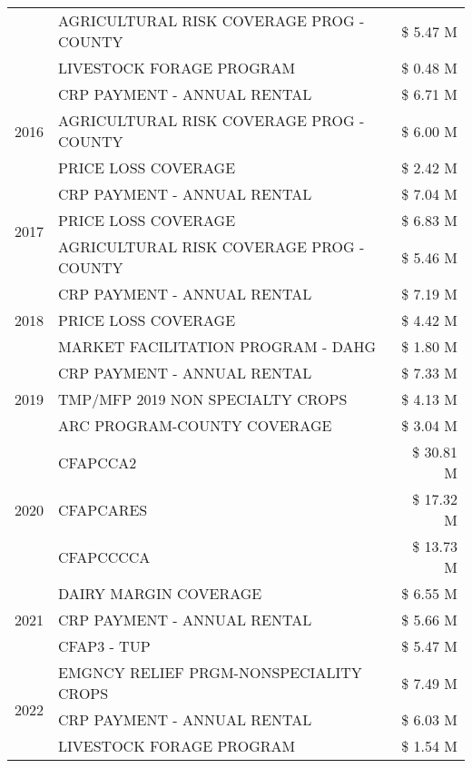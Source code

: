 \begin{tabular}{llr}
 & AGRICULTURAL RISK COVERAGE PROG - COUNTY & \$ 5.47 M \\
 & LIVESTOCK FORAGE PROGRAM & \$ 0.48 M \\
\cline{1-3}
\multirow[t]{3}{*}{2016} & CRP PAYMENT - ANNUAL RENTAL & \$ 6.71 M \\
 & AGRICULTURAL RISK COVERAGE PROG - COUNTY & \$ 6.00 M \\
 & PRICE LOSS COVERAGE & \$ 2.42 M \\
\cline{1-3}
\multirow[t]{3}{*}{2017} & CRP PAYMENT - ANNUAL RENTAL & \$ 7.04 M \\
 & PRICE LOSS COVERAGE & \$ 6.83 M \\
 & AGRICULTURAL RISK COVERAGE PROG - COUNTY & \$ 5.46 M \\
\cline{1-3}
\multirow[t]{3}{*}{2018} & CRP PAYMENT - ANNUAL RENTAL & \$ 7.19 M \\
 & PRICE LOSS COVERAGE & \$ 4.42 M \\
 & MARKET FACILITATION PROGRAM - DAHG & \$ 1.80 M \\
\cline{1-3}
\multirow[t]{3}{*}{2019} & CRP PAYMENT - ANNUAL RENTAL & \$ 7.33 M \\
 & TMP/MFP 2019 NON SPECIALTY CROPS & \$ 4.13 M \\
 & ARC PROGRAM-COUNTY COVERAGE & \$ 3.04 M \\
\cline{1-3}
\multirow[t]{3}{*}{2020} & CFAPCCA2 & \$ 30.81 M \\
 & CFAPCARES & \$ 17.32 M \\
 & CFAPCCCCA & \$ 13.73 M \\
\cline{1-3}
\multirow[t]{3}{*}{2021} & DAIRY MARGIN COVERAGE & \$ 6.55 M \\
 & CRP PAYMENT - ANNUAL RENTAL & \$ 5.66 M \\
 & CFAP3 - TUP & \$ 5.47 M \\
\cline{1-3}
\multirow[t]{3}{*}{2022} & EMGNCY RELIEF PRGM-NONSPECIALITY CROPS & \$ 7.49 M \\
 & CRP PAYMENT - ANNUAL RENTAL & \$ 6.03 M \\
 & LIVESTOCK FORAGE PROGRAM & \$ 1.54 M \\
\cline{1-3}
\bottomrule
\end{tabular}

